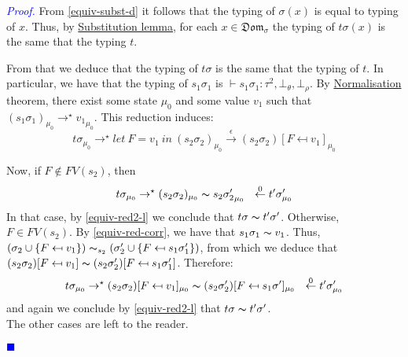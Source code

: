 \documentclass[a4paper,11pt,oneside]{article}
\theoremstyle{plain}
\newtheorem{lemma}[definition]{Lemma}
\renewenvironment{proof}{\noindent \begin{adjustwidth}{1.5em}{} \textcolor{blue}{\textit{Proof.}}}
{{\begin{tiny}\textcolor{blue}{$\blacksquare$}\end{tiny}}
\end{adjustwidth}~\\\noindent}
\newcommand{\bth}{\bot_\theta}
\newcommand{\brh}{\bot_\rho}
\begin{document}
\begin{proof}
	From \cref{equiv-subst-d} it follows that the typing of $\sigma(x)$ is equal to typing of $x$.
	Thus, by \hyperlink{subst-lemma}{Substitution lemma}, for each $x \in \mathfrak{Dom}_\sigma$ the typing of $t\sigma(x)$ is the same that the typing $t$. 

	From that we deduce that the typing of $t\sigma$ is the same that the typing of $t$.
	In particular, we have that the typing of $s_1 \sigma_1$ is $\vdash s_1 \sigma_1 : \tau^2, \bth, \brh$.
	By \hyperlink{term-il}{Normalisation} theorem, there exist some state $\mu_0$ and some value $v_1$ such that $(s_1 \sigma_1)_{\mu_0} \rightarrow^\star {v_1}_{\mu_0}$. This reduction induces:	
$$ t\sigma_{\mu_0} \rightarrow^\star let~F=v_1~in~(s_2\sigma_2)_{\mu_0} \stackrel{\epsilon}{\rightarrow} (s_2\sigma_2)[F \mapsfrom v_1]_{\mu_0}$$ 	 
	 
	Now, if $F \not\in FV(s_2)$, then 
	$$t\sigma_{\mu_0}\rightarrow^\star (s_2\sigma_2)_{\mu_0} \thicksim {s_2\sigma_2'}_{\mu_0}~~ \stackrel{0}{\leftarrow} t'\sigma'_{\mu_0}$$	
	In that case, by \cref{equiv-red2-l} we conclude that $t\sigma \thicksim t'\sigma'$. 
Otherwise, 	$F \in FV(s_2)$. By \cref{equiv-red-corr}, we have that $ s_1\sigma_1 \thicksim v_1$. Thus, 
$(\sigma_2 \cup \{ F \mapsfrom v_1\}) \thicksim_{s_2} (\sigma_2' \cup \{ F \mapsfrom s_1\sigma_1'\})$, from which we deduce that $ (s_2\sigma_2)[F \mapsfrom v_1] \thicksim (s_2\sigma_2')[F \mapsfrom s_1\sigma_1']$. Therefore:
	$$t\sigma_{\mu_0}\rightarrow^\star (s_2\sigma_2)[F \mapsfrom v_1]_{\mu_0}  \thicksim (s_2\sigma_2')[F \mapsfrom s_1\sigma']_{\mu_0}~~ \stackrel{0}{\leftarrow} t'\sigma'_{\mu_0}$$
and again we conclude by \cref{equiv-red2-l} that $t\sigma \thicksim t'\sigma'$. \\

The other cases are left to the reader.


	\end{proof}	  
  	
	
	
	

	
\newpage


\end{document}
